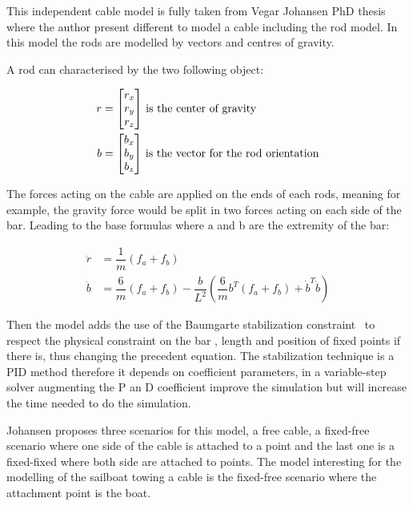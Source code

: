 This independent cable model is fully taken from  Vegar Johansen PhD thesis~\cite{johansen2007modelling} where the author present different to model a cable including the rod model. In this model the rods are modelled by vectors and centres of gravity.

A rod can characterised by the two following object:

\begin{align}
r &= \begin{bmatrix}
    r_x \\
    r_y \\
    r_z
\end{bmatrix}\, \textnormal{is the center of gravity}\\
b &= \begin{bmatrix}
    b_x \\
    b_y \\
    b_z
\end{bmatrix}\, \textnormal{is the vector for the rod orientation}
\end{align}

The forces acting on the cable are applied on the ends of each rods, meaning for example, the gravity force would be split in two forces acting on each side of the bar. Leading to the base formulas where a and b are the extremity of the bar:

\begin{align}
\ddot{r} &= \dfrac{1}{m}  (f_a+f_b) \\
\ddot{b} &=  \dfrac{6}{m}(f_a+f_b) - \dfrac{b}{L^{2}}  (\dfrac{6}{m}b^{T}(f_a+f_b)+\dot{b}^{T}\dot{b}) 
\end{align}

Then the model adds the use of the Baumgarte stabilization constraint~\cite{baumgarte1972stabilization} to respect the physical constraint on the bar , length and position of fixed points if there is, thus changing the precedent equation. 
The stabilization technique is a PID method therefore it depends on coefficient parameters, in a variable-step solver augmenting the P an D coefficient improve the simulation but will increase the time needed to do the simulation.

Johansen proposes three scenarios for this model, a free cable, a fixed-free scenario where one side of the cable is attached to a point and the last one is a fixed-fixed where both side are attached to points.
The model interesting for the modelling of the sailboat towing a cable is the fixed-free scenario where the attachment point is the boat.


